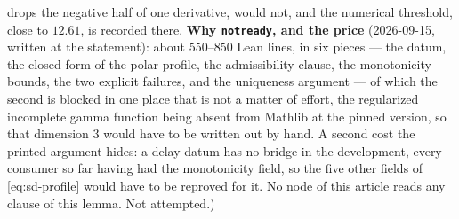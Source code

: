 \begin{lemma}
{drops the negative half of one derivative, would not, and the numerical threshold, close to
$12.61$, is recorded there. \textbf{Why \texttt{notready}, and the price} (2026-09-15, written at
the statement): about $550$--$850$ Lean lines, in six pieces --- the datum, the closed form of the
polar profile, the admissibility clause, the monotonicity bounds, the two explicit failures, and
the uniqueness argument --- of which the second is blocked in one place that is not a matter of
effort, the regularized incomplete gamma function being absent from Mathlib at the pinned
version, so that dimension $3$ would have to be written out by hand. A second cost the printed
argument hides: a delay datum has no bridge in the development, every consumer so far having had
the monotonicity field, so the five other fields of \ref{eq:sd-profile} would have to be
reproved for it. No node of this article reads any clause of this lemma. Not attempted.)}
\end{lemma}

